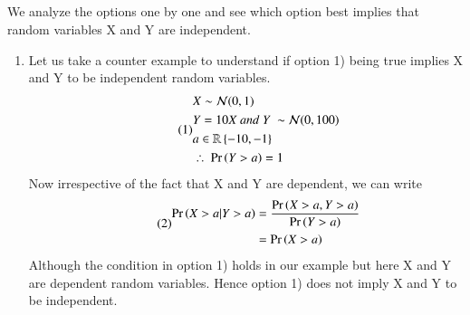 \documentclass[journal,12pt,twocolumn]{IEEEtran}
\begin{document}
\subsection*{}
We analyze the options one by one and see which option best implies that random variables X and Y are independent. \\
\begin{enumerate}
    \item Let us take a counter example to understand if option 1) being true implies X and Y to be independent random variables.
\begin{align}\tag{1}
    \begin{split}
        &X \sim \mathcal{N}(0, 1)\\
        &Y = 10X\ and\ Y\ \sim \mathcal{N}(0, 100)\\
        &a \in \mathbb{R}\left\{-10, -1\right\}\\
        &\therefore\ \Pr\left(Y>a\right) = 1\\
    \end{split}
\end{align}
Now irrespective of the fact that X and Y are dependent, we can write
\begin{align}\tag{2}
    \begin{split}
        \Pr\left(X>a|Y>a\right) &= \frac{\Pr\left(X>a, Y>a\right)}{\Pr\left(Y>a\right)}\\
                     &= \Pr\left(X>a\right)
    \end{split}
\end{align}
Although the condition in option 1) holds in our example but here X and Y are dependent random variables. Hence option 1) does not imply X and Y to be independent.\\


\end{enumerate}
\end{document}
